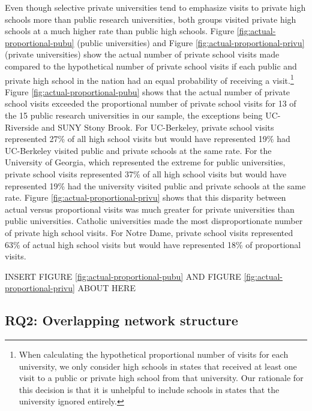 \documentclass[
  12pt,
]{article}
\begin{document}
Even though selective private universities tend to emphasize visits to private high schools more than public research universities, both groups visited private high schools at a much higher rate than public high schools. Figure \ref{fig:actual-proportional-pubu} (public universities) and Figure \ref{fig:actual-proportional-privu} (private universities) show the actual number of private school visits made compared to the hypothetical number of private school visits if each public and private high school in the nation had an equal probability of receiving a visit.\footnote{When calculating the hypothetical proportional number of visits for each university, we only consider high schools in states that received at least one visit to a public or private high school from that university. Our rationale for this decision is that it is unhelpful to include schools in states that the university ignored entirely.} Figure \ref{fig:actual-proportional-pubu} shows that the actual number of private school visits exceeded the proportional number of private school visits for 13 of the 15 public research universities in our sample, the exceptions being UC-Riverside and SUNY Stony Brook. For UC-Berkeley, private school visits represented 27\% of all high school visits but would have represented 19\% had UC-Berkeley visited public and private schools at the same rate. For the University of Georgia, which represented the extreme for public universities, private school visits represented 37\% of all high school visits but would have represented 19\% had the university visited public and private schools at the same rate. Figure \ref{fig:actual-proportional-privu} shows that this disparity between actual versus proportional visits was much greater for private universities than public universities. Catholic universities made the most disproportionate number of private high school visits. For Notre Dame, private school visits represented 63\% of actual high school visits but would have represented 18\% of proportional visits.

INSERT FIGURE \ref{fig:actual-proportional-pubu} AND FIGURE \ref{fig:actual-proportional-privu} ABOUT HERE

\subsection{RQ2: Overlapping network structure}\label{rq2-overlapping-network-structure}
\end{document}
